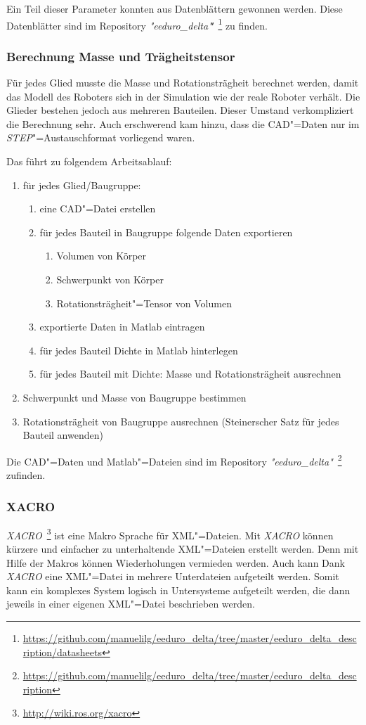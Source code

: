 Ein Teil dieser Parameter konnten aus Datenblättern gewonnen werden.
Diese Datenblätter sind im Repository \textit{\textit{"}eeduro\_delta\textbf{"}}~\footnote{\url{https://github.com/manuelilg/eeduro\_delta/tree/master/eeduro\_delta\_description/datasheets}} zu finden.

\subsubsection{Berechnung Masse und Trägheitstensor}
Für jedes Glied musste die Masse und Rotationsträgheit berechnet werden, damit das Modell des Roboters sich in der Simulation wie der reale Roboter verhält.
Die Glieder bestehen jedoch aus mehreren Bauteilen.
Dieser Umstand verkompliziert die Berechnung sehr.
Auch erschwerend kam hinzu, dass die CAD"=Daten nur im \textit{STEP}"=Austauschformat vorliegend waren.

Das führt zu folgendem Arbeitsablauf:
\begin{enumerate}
\item für jedes Glied/Baugruppe: 
\begin{enumerate}
\item eine CAD"=Datei erstellen
\item für jedes Bauteil in Baugruppe folgende Daten exportieren
\begin{enumerate}
\item Volumen von Körper
\item Schwerpunkt von Körper
\item Rotationsträgheit"=Tensor von Volumen
\end{enumerate}
\item exportierte Daten in Matlab eintragen
\item für jedes Bauteil Dichte in Matlab hinterlegen
\item für jedes Bauteil mit Dichte: Masse und Rotationsträgheit ausrechnen  
\end{enumerate}
\item Schwerpunkt und Masse von Baugruppe bestimmen
\item Rotationsträgheit von Baugruppe ausrechnen (Steinerscher Satz für jedes Bauteil anwenden)
\end{enumerate}

Die CAD"=Daten und Matlab"=Dateien sind im Repository \textit{\textit{"}eeduro\_delta\textit{"}}~\footnote{\url{https://github.com/manuelilg/eeduro_delta/tree/master/eeduro_delta_description}} zufinden.

\subsubsection{XACRO}
\label{chap:xacro}
\textit{XACRO}~\footnote{\url{http://wiki.ros.org/xacro}} ist eine Makro Sprache für XML"=Dateien.
Mit \textit{XACRO} können kürzere und einfacher zu unterhaltende XML"=Dateien erstellt werden.
Denn mit Hilfe der Makros können Wiederholungen vermieden werden.
Auch kann Dank \textit{XACRO} eine XML"=Datei in mehrere Unterdateien aufgeteilt werden.
Somit kann ein komplexes System logisch in Untersysteme aufgeteilt werden, die dann jeweils in einer eigenen XML"=Datei beschrieben werden. 

